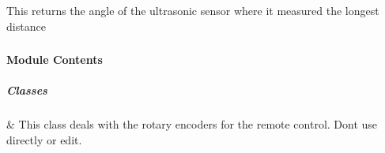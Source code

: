 \documentclass[letterpaper,10pt,english]{sphinxmanual}
\begin{document}
\begin{fulllineitems}
\begin{fulllineitems}
\end{fulllineitems}


\begin{fulllineitems}
\label{\detokenize{autoapi/robotlibrary/robot/index:robotlibrary.robot.Robot.get_longest_distance}}
\pysigstartsignatures
{}
\pysigstopsignatures
\sphinxAtStartPar
This returns the angle of the ultrasonic sensor where it measured the longest distance

\end{fulllineitems}


\end{fulllineitems}


\sphinxstepscope


\subsubsection{}
\label{\detokenize{autoapi/robotlibrary/rotary/index:module-robotlibrary.rotary}}\label{\detokenize{autoapi/robotlibrary/rotary/index:robotlibrary-rotary}}\label{\detokenize{autoapi/robotlibrary/rotary/index::doc}}

\paragraph{Module Contents}
\label{\detokenize{autoapi/robotlibrary/rotary/index:module-contents}}

\subparagraph{Classes}
\label{\detokenize{autoapi/robotlibrary/rotary/index:classes}}

\begin{savenotes}\sphinxattablestart
\sphinxthistablewithglobalstyle
\sphinxthistablewithnovlinesstyle
\centering
\begin{tabulary}{\linewidth}[t]{}
\sphinxtoprule
\sphinxtableatstartofbodyhook
\sphinxAtStartPar
{\hyperref[\detokenize{autoapi/robotlibrary/rotary/index:robotlibrary.rotary.Rotary}]{}}
&
\sphinxAtStartPar
This class deals with the rotary encoders for the remote control. Don\textquotesingle{}t use directly or edit.
\\
\sphinxbottomrule
\end{tabulary}
\sphinxtableafterendhook\par
\sphinxattableend\end{savenotes}
\end{document}
